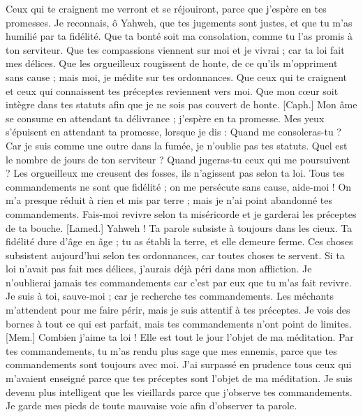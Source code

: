 \begin{multicols}{2}
Ceux qui te craignent me verront et se réjouiront, parce que j’espère en tes promesses.
Je reconnais, ô Yahweh, que tes jugements sont justes, et que tu m’as humilié par ta fidélité.
Que ta bonté soit ma consolation, comme tu l’as promis à ton serviteur.
Que tes compassions viennent sur moi et je vivrai ; car ta loi fait mes délices.
Que les orgueilleux rougissent de honte, de ce qu’ils m’oppriment sans cause ; mais moi, je médite sur tes ordonnances.
Que ceux qui te craignent et ceux qui connaissent tes préceptes reviennent vers moi.
Que mon cœur soit intègre dans tes statuts afin que je ne sois pas couvert de honte.
[Caph.] Mon âme se consume en attendant ta délivrance ; j’espère en ta promesse.
Mes yeux s’épuisent en attendant ta promesse, lorsque je dis : Quand me consoleras-tu ?
Car je suis comme une outre dans la fumée, je n'oublie pas tes statuts.
Quel est le nombre de jours de ton serviteur ? Quand jugeras-tu ceux qui me poursuivent ?
Les orgueilleux me creusent des fosses, ils n’agissent pas selon ta loi.
Tous tes commandements ne sont que fidélité ; on me persécute sans cause, aide-moi !
On m'a presque réduit à rien et mis par terre ; mais je n'ai point abandonné tes commandements.
Fais-moi revivre selon ta miséricorde et je garderai les préceptes de ta bouche.
[Lamed.] Yahweh ! Ta parole subsiste à toujours dans les cieux.
Ta fidélité dure d'âge en âge ; tu as établi la terre, et elle demeure ferme.
Ces choses subsistent aujourd'hui selon tes ordonnances, car toutes choses te servent.
Si ta loi n’avait pas fait mes délices, j’aurais déjà péri dans mon affliction.
Je n'oublierai jamais tes commandements car c’est par eux que tu m'as fait revivre.
Je suis à toi, sauve-moi ; car je recherche tes commandements.
Les méchants m'attendent pour me faire périr, mais je suis attentif à tes préceptes.
Je vois des bornes à tout ce qui est parfait, mais tes commandements n’ont point de limites.
[Mem.] Combien j'aime ta loi ! Elle est tout le jour l’objet de ma méditation.
Par tes commandements, tu m'as rendu plus sage que mes ennemis, parce que tes commandements sont toujours avec moi.
J'ai surpassé en prudence tous ceux qui m'avaient enseigné parce que tes préceptes sont l’objet de ma méditation.
Je suis devenu plus intelligent que les vieillards parce que j'observe tes commandements.
Je garde mes pieds de toute mauvaise voie afin d’observer ta parole.

\end{multicols}
